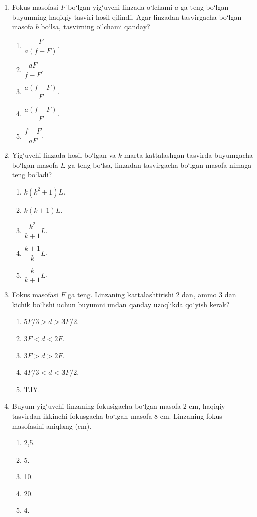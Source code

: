 \begin{enumerate}
\item Fokus masofasi $F$ bo‘lgan yig‘uvchi linzada o‘lchami $a$ ga teng bo‘lgan buyumning haqiqiy tasviri hosil qilindi. Agar linzadan tasvirgacha bo‘lgan masofa $b$ bo‘lsa, tasvirning o‘lchami qanday?
\begin{enumerate}[label=\Alph*)]
\item $\dfrac{F}{a(f-F)}$.
\item $\dfrac{aF}{f-F}$.
\item $\dfrac{a(f-F)}{F}$.
\item $\dfrac{a(f+F)}{F}$.
\item $\dfrac{f-F}{aF}$.
\end{enumerate}

\item Yig‘uvchi linzada hosil bo‘lgan va $k$ marta kattalashgan tasvirda buyumgacha bo‘lgan masofa $L$ ga teng bo‘lsa, linzadan tasvirgacha bo‘lgan masofa nimaga teng bo‘ladi?
\begin{enumerate}[label=\Alph*)]
\item $k(k^2+1)L$.
\item $k(k+1)L$.
\item $\dfrac{k^2}{k+1}L$.
\item $\dfrac{k+1}{k}L$.
\item $\dfrac{k}{k+1}L$.
\end{enumerate}

\item Fokus masofasi $F$ ga teng. Linzaning kattalashtirishi 2 dan, ammo 3 dan kichik bo‘lishi uchun buyumni undan qanday uzoqlikda qo‘yish kerak?
\begin{enumerate}[label=\Alph*)]
\item $5F/3>d>3F/2$.
\item $3F<d<2F$.
\item $3F>d>2F$.
\item $4F/3<d<3F/2$.
\item TJY.
\end{enumerate}

\item Buyum yig‘uvchi linzaning fokusigacha bo‘lgan masofa 2 cm, haqiqiy tasvirdan ikkinchi fokusgacha bo‘lgan masofa 8 cm. Linzaning fokus masofasini aniqlang (cm).
\begin{enumerate}[label=\Alph*)]
\item 2,5.
\item 5.
\item 10.
\item 20.
\item 4.
\end{enumerate}


\end{enumerate}
